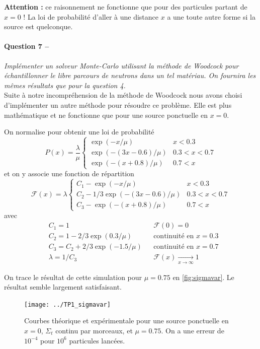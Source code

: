 \documentclass[11pt,a4paper]{article}
\newcommand{\question}[2]{\paragraph{Question #1 --}\hspace{-7pt}\textit{#2} \\}
\newcommand{\F}{\mathcal{F}}
\begin{document}
\textbf{Attention : } ce raisonnement ne fonctionne que pour des particules partant de $x=0$ ! La loi de probabilité d'aller à une distance $x$ a une toute autre forme si la source est quelconque.

\question{7}{Implémenter un solveur Monte-Carlo utilisant la méthode de Woodcock pour échantillonner le libre parcours de neutrons dans un tel matériau. On fournira les mêmes résultats que pour la question 4.}

Suite à notre incompréhension de la méthode de Woodcock nous avons choisi d'implémenter un autre méthode pour résoudre ce problème. Elle est plus mathématique et ne fonctionne que pour une source ponctuelle en $x=0$.

On normalise pour obtenir une loi de probabilité
\begin{equation}
  P(x) = \frac{\lambda}{\mu}
  \begin{cases}
    \exp(-x/\mu)         & x<0.3\\
    \exp(-(3x-0.6)/\mu) & 0.3<x<0.7\\
    \exp(-(x+0.8)/\mu)  & 0.7<x
  \end{cases}
\end{equation}
et on y associe une fonction de répartition
\begin{equation}
  \F(x) = \lambda
  \begin{cases}
    C_1 - \exp(-x/\mu)             & x<0.3\\    
    C_2 - 1/3 \exp(-(3x-0.6)/\mu) & 0.3<x<0.7\\
    C_3 - \exp(-(x+0.8)/\mu)      & 0.7<x      
  \end{cases}
\end{equation}
avec
\begin{align}
  &C_1 = 1 && \F(0)=0 \\
  &C_2 = 1 - 2/3 \exp(0.3/\mu) && \mbox{continuité en }x=0.3 \\
  &C_3 = C_2 + 2/3 \exp(-1.5/\mu) &&  \mbox{continuité en }x=0.7 \\
  &\lambda = 1/C_3 &&  \F(x)  \xrightarrow[x \to \infty]{} 1
\end{align}

On trace le résultat de cette simulation pour $\mu=0.75$ en \autoref{fig:sigmavar}. Le résultat semble largement satisfaisant.
\begin{figure}
  \centering
  \texttt{[image: ../TP1\_sigmavar]}
  \caption{Courbes théorique et expérimentale pour une source ponctuelle en $x=0$, $\Sigma_t$ continu par morceaux, et $\mu=0.75$. On a une erreur de $10^{-4}$ pour $10^6$ particules lancées.}
  \label{fig:sigmavar}
\end{figure}
\end{document}
